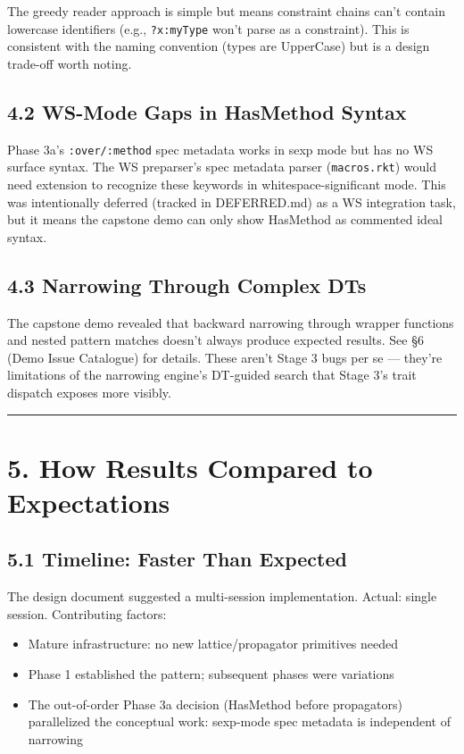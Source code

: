 \documentclass[11pt]{article}
\begin{document}
The greedy reader approach is simple but means constraint chains can't contain lowercase
identifiers (e.g., \texttt{?x:myType} won't parse as a constraint). This is consistent with
the naming convention (types are UpperCase) but is a design trade-off worth noting.
\subsection{4.2 WS-Mode Gaps in HasMethod Syntax}
\label{sec:orgad3912d}

Phase 3a's \texttt{:over/:method} spec metadata works in sexp mode but has no WS surface
syntax. The WS preparser's spec metadata parser (\texttt{macros.rkt}) would need extension
to recognize these keywords in whitespace-significant mode. This was intentionally
deferred (tracked in DEFERRED.md) as a WS integration task, but it means the
capstone demo can only show HasMethod as commented ideal syntax.
\subsection{4.3 Narrowing Through Complex DTs}
\label{sec:orgbdfa283}

The capstone demo revealed that backward narrowing through wrapper functions and
nested pattern matches doesn't always produce expected results. See §6 (Demo Issue
Catalogue) for details. These aren't Stage 3 bugs per se — they're limitations of
the narrowing engine's DT-guided search that Stage 3's trait dispatch exposes more
visibly.

\noindent\rule{\textwidth}{0.5pt}
\section{5. How Results Compared to Expectations}
\label{sec:orgdcebef5}

\subsection{5.1 Timeline: Faster Than Expected}
\label{sec:orgd8496c4}

The design document suggested a multi-session implementation. Actual: single session.
Contributing factors:

\begin{itemize}
\item Mature infrastructure: no new lattice/propagator primitives needed
\item Phase 1 established the pattern; subsequent phases were variations
\item The out-of-order Phase 3a decision (HasMethod before propagators) parallelized
the conceptual work: sexp-mode spec metadata is independent of narrowing
\end{itemize}
\end{document}
